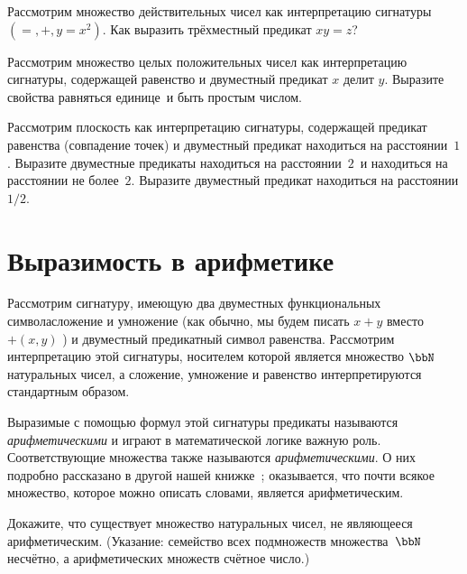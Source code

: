 \begin{problem}
Рассмотрим множество действительных чисел как интерпретацию
сигнатуры $({=},{+}, {y=x^2})$. Как выразить трёхместный
предикат $xy=z$?
\end{problem}

\begin{problem}
Рассмотрим множество целых положительных чисел как интерпретацию
сигнатуры, содержащей равенство и двуместный предикат  $x$
делит $y$. Выразите свойства  равняться единице\ и 
быть простым числом.
\end{problem}

\begin{problem}
Рассмотрим плоскость как интерпретацию сигнатуры, содержащей
предикат равенства (совпадение точек) и двуместный предикат 
находиться на расстоянии~$1$. Выразите двуместные предикаты
 находиться на расстоянии~$2$\ и  находиться на
расстоянии не более~$2$. Выразите двуместный предикат 
находиться на расстоянии $1/2$.
\end{problem}

\section{Выразимость в арифметике}
        \label{arithmetic-definability}%

Рассмотрим сигнатуру, имеющую два двуместных функциональных
символа\т сложение и умножение (как обычно, мы будем писать
$x+y$ вместо $+(x,y)$ ) и двуместный предикатный символ
равенства. Рассмотрим интерпретацию этой сигнатуры, носителем
которой является множество $\bbN$ натуральных чисел, а сложение,
умножение и равенство интерпретируются стандартным образом.

Выразимые с помощью формул этой сигнатуры предикаты называются
\emph{арифметическими}%
%
и играют в математической логике важную
роль. Соответствующие множества также называются
\emph{арифметическими}.%
%
О них подробно рассказано в другой нашей
книжке~\cite{computable-functions}; оказывается, что почти
всякое множество, которое можно описать словами, является
арифметическим.

\begin{problem}
Докажите, что существует множество натуральных чисел, не
являющееся арифметическим. (Указание: семейство всех подмножеств
множества~$\bbN$ несчётно, а арифметических множеств
счётное число.)
\end{problem}

